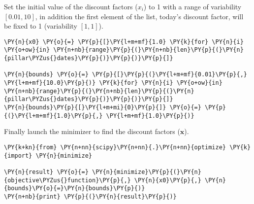 \begin{Answer}
Set the initial value of the discount factors (\(x_i\)) to 1 with a
  range of variability \([ 0.01, 10]\), in addition the first element of
  the list, today's discount factor, will be fixed to 1 (variability
  \([1, 1]\)).

\begin{codebox}[breakable, size=fbox, boxrule=1pt, pad at break*=1mm,colback=cellbackground, colframe=cellborder]
\begin{Verbatim}[commandchars=\\\{\}]
\PY{n}{x0} \PY{o}{=} \PY{p}{[}\PY{l+m+mf}{1.0} \PY{k}{for} \PY{n}{i} \PY{o+ow}{in} \PY{n+nb}{range}\PY{p}{(}\PY{n+nb}{len}\PY{p}{(}\PY{n}{pillar\PYZus{}dates}\PY{p}{)}\PY{p}{)}\PY{p}{]}

\PY{n}{bounds} \PY{o}{=} \PY{p}{[}\PY{p}{(}\PY{l+m+mf}{0.01}\PY{p}{,} \PY{l+m+mf}{10.0}\PY{p}{)} \PY{k}{for} \PY{n}{i} \PY{o+ow}{in} \PY{n+nb}{range}\PY{p}{(}\PY{n+nb}{len}\PY{p}{(}\PY{n}{pillar\PYZus{}dates}\PY{p}{)}\PY{p}{)}\PY{p}{]}
\PY{n}{bounds}\PY{p}{[}\PY{l+m+mi}{0}\PY{p}{]} \PY{o}{=} \PY{p}{(}\PY{l+m+mf}{1.0}\PY{p}{,} \PY{l+m+mf}{1.0}\PY{p}{)}
\end{Verbatim}
\end{codebox}

Finally launch the minimizer to find the discount factors (\(\mathbf{x}\)).

\begin{codebox}[breakable, size=fbox, boxrule=1pt, pad at break*=1mm,colback=cellbackground, colframe=cellborder]
\begin{Verbatim}[commandchars=\\\{\}]
\PY{k+kn}{from} \PY{n+nn}{scipy}\PY{n+nn}{.}\PY{n+nn}{optimize} \PY{k}{import} \PY{n}{minimize}

\PY{n}{result} \PY{o}{=} \PY{n}{minimize}\PY{p}{(}\PY{n}{objective\PYZus{}function}\PY{p}{,} \PY{n}{x0}\PY{p}{,} \PY{n}{bounds}\PY{o}{=}\PY{n}{bounds}\PY{p}{)}
\PY{n+nb}{print} \PY{p}{(}\PY{n}{result}\PY{p}{)}


\end{Verbatim}
\end{codebox}
\end{Answer}
